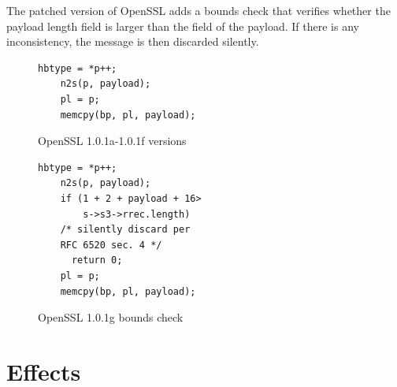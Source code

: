 \documentclass[12pt,a4paper,english,onecolumn]{IEEEtran}
\begin{document}
The patched version of OpenSSL adds a bounds check that verifies whether the payload length field is larger than the field of the payload. If there is any inconsistency, the message is then discarded silently. \par

\begin{figure}[!htb]
\noindent\begin{minipage}[b]{0.4\textwidth}
\begin{lstlisting}[]
    hbtype = *p++;
    n2s(p, payload);
    pl = p;
    memcpy(bp, pl, payload);
\end{lstlisting}
\caption*{OpenSSL 1.0.1a-1.0.1f versions}
\end{minipage}%
\hfill
\noindent\begin{minipage}[b]{0.45\textwidth}
\begin{lstlisting}[]
    hbtype = *p++;
    n2s(p, payload);
    if (1 + 2 + payload + 16>
        s->s3->rrec.length)
    /* silently discard per
    RFC 6520 sec. 4 */
      return 0; 
    pl = p;
    memcpy(bp, pl, payload);
\end{lstlisting}
\caption*{OpenSSL 1.0.1g bounds check}
\end{minipage}%
\end{figure} 

\vspace{30px}
\section{Effects}
\end{document}
